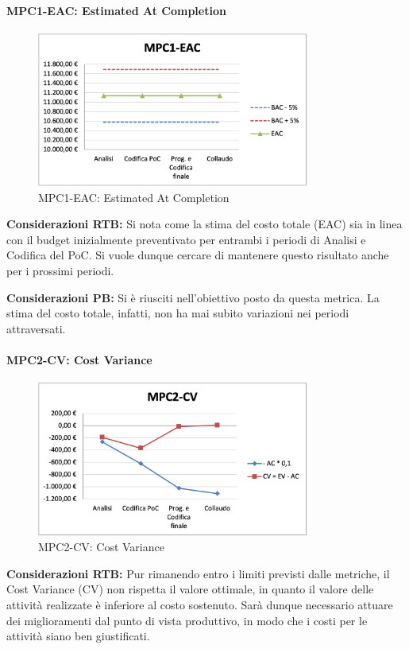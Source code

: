 \paragraph{MPC1-EAC: Estimated At Completion}
\begin{figure}[h!]
    \centering
    \includegraphics[width=0.8\textwidth]{images/MPC1-EAC.png}
    \caption{MPC1-EAC: Estimated At Completion}
\end{figure}
\noindent \textbf{Considerazioni RTB:} Si nota come la stima del costo totale (EAC) sia in linea con il budget inizialmente preventivato per entrambi i periodi di Analisi e Codifica del PoC. Si vuole dunque cercare di mantenere questo risultato anche per i prossimi periodi.

\vspace{0.5cm}

\noindent \textbf{Considerazioni PB:} Si è riusciti nell'obiettivo posto da questa metrica. La stima del costo totale, infatti, non ha mai subito variazioni nei periodi attraversati.

\newpage
\paragraph{MPC2-CV: Cost Variance}
\begin{figure}[h!] 
    \centering
    \includegraphics[width=0.8\textwidth]{images/MPC2-CV.png}
    \caption{MPC2-CV: Cost Variance}
\end{figure}
\noindent \textbf{Considerazioni RTB:} Pur rimanendo entro i limiti previsti dalle metriche, il Cost Variance (CV) non rispetta il valore ottimale, in quanto il valore delle attività realizzate è inferiore al costo sostenuto. Sarà dunque necessario attuare dei miglioramenti dal punto di vista produttivo, in modo che i costi per le attività siano ben giustificati.


